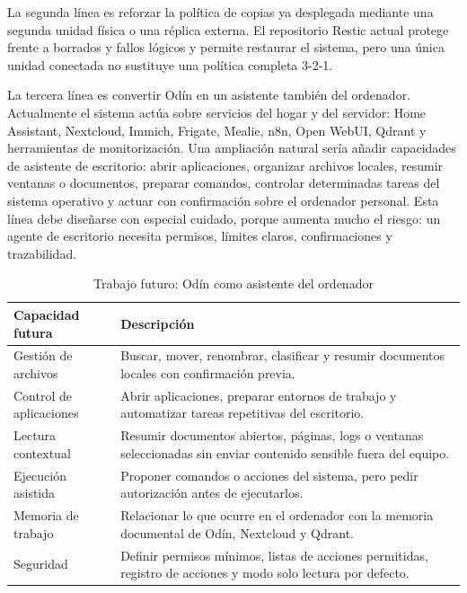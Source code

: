 La segunda línea es reforzar la política de copias ya desplegada mediante una segunda unidad física o una réplica externa. El repositorio Restic actual protege frente a borrados y fallos lógicos y permite restaurar el sistema, pero una única unidad conectada no sustituye una política completa 3-2-1.

La tercera línea es convertir Odín en un asistente también del ordenador. Actualmente el sistema actúa sobre servicios del hogar y del servidor: Home Assistant, Nextcloud, Immich, Frigate, Mealie, n8n, Open WebUI, Qdrant y herramientas de monitorización. Una ampliación natural sería añadir capacidades de asistente de escritorio: abrir aplicaciones, organizar archivos locales, resumir ventanas o documentos, preparar comandos, controlar determinadas tareas del sistema operativo y actuar con confirmación sobre el ordenador personal. Esta línea debe diseñarse con especial cuidado, porque aumenta mucho el riesgo: un agente de escritorio necesita permisos, límites claros, confirmaciones y trazabilidad.

\begin{table}[H]
  \centering
  \caption{Trabajo futuro: Odín como asistente del ordenador}
  \label{tab:futuro-asistente-ordenador}
  \begin{tabularx}{\textwidth}{lX}
    \toprule
    Capacidad futura & Descripción \\
    \midrule
    Gestión de archivos & Buscar, mover, renombrar, clasificar y resumir documentos locales con confirmación previa. \\
    Control de aplicaciones & Abrir aplicaciones, preparar entornos de trabajo y automatizar tareas repetitivas del escritorio. \\
    Lectura contextual & Resumir documentos abiertos, páginas, logs o ventanas seleccionadas sin enviar contenido sensible fuera del equipo. \\
    Ejecución asistida & Proponer comandos o acciones del sistema, pero pedir autorización antes de ejecutarlos. \\
    Memoria de trabajo & Relacionar lo que ocurre en el ordenador con la memoria documental de Odín, Nextcloud y Qdrant. \\
    Seguridad & Definir permisos mínimos, listas de acciones permitidas, registro de acciones y modo solo lectura por defecto. \\
    \bottomrule
  \end{tabularx}
\end{table}

